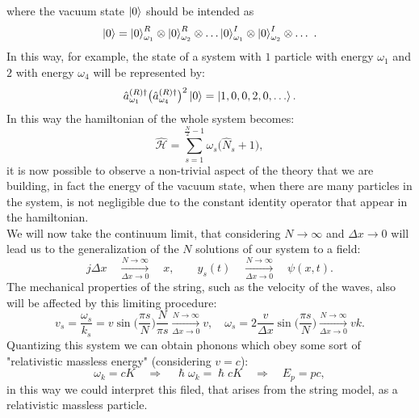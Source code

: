 where the vacuum state $\ket{0}$ should be intended as
\begin{equation*}
    \ket{0}=\ket{0}_{\omega_1}^R\otimes\ket{0}_{\omega_2}^R\otimes\dots\ket{0}_{\omega_1}^I\otimes\ket{0}_{\omega_2}^I\otimes\dots\ .
\end{equation*}
In this way, for example, the state of a system with $1$ particle with energy $\omega_1$ and $2$ with energy $\omega_4$ will be represented by:
\begin{equation*}
    \hat{a}^{(R)\dagger}_{\omega_1} \big(\hat{a}^{(R)\dagger}_{\omega_4}\big)^2\ket{0}=\ket{1,0,0,2,0,\dots}.
\end{equation*}
In this way the hamiltonian of the whole system becomes:
\begin{equation*}
    \hat{\mathcal{H}} = \sum_{s=1}^{\frac{N}{2}-1}\omega_s\big(\hat{ N}_s+1\big),
\end{equation*}
it is now possible to observe a non-trivial aspect of the theory that we are building, in fact the energy of the vacuum state, when there are many particles in the system, is not negligible due to the constant identity operator that appear in the hamiltonian.\\

We will now take the continuum limit, that considering $N\rightarrow\infty$ and $\Delta x\rightarrow 0$ will lead us to the generalization of the $N$ solutions of our system to a field:
\begin{equation*}
    j\Delta x\quad \xrightarrow[\Delta x\rightarrow0]{N\rightarrow\infty}\quad x,\qquad y_s(t)\quad\xrightarrow[\Delta x\rightarrow0]{N\rightarrow\infty}\quad\psi(x,t).
\end{equation*}
The mechanical properties of the string, such as the velocity of the waves, also will be affected by this limiting procedure:
\begin{equation*}
    v_s=\frac{\omega_s}{k_s}=v\sin\bigg(\frac{\pi s}{N}\bigg)\frac{N}{\pi s}\xrightarrow[\Delta x\rightarrow0]{N\rightarrow\infty}v,\quad \omega_s=2\frac{v}{\Delta x}\sin\bigg(\frac{\pi s}{N}\bigg)\xrightarrow[\Delta x\rightarrow0]{N\rightarrow\infty}vk.
\end{equation*}
Quantizing this system we can obtain phonons which obey some sort of "relativistic massless energy" (considering $v=c$):
\begin{equation*}
    \omega_k=cK\quad\Rightarrow\quad  \hslash\omega_k=\hslash cK\quad\Rightarrow\quad E_p=pc,
\end{equation*}
in this way we could interpret this filed, that arises from the string model, as a relativistic massless particle.\\

